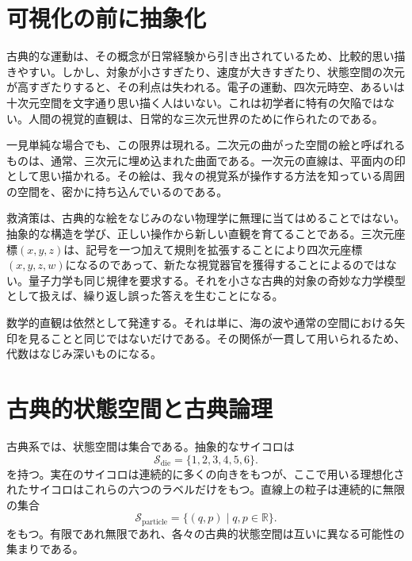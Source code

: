 \section{可視化の前に抽象化}

古典的な運動は、その概念が日常経験から引き出されているため、比較的思い描きやすい。しかし、対象が小さすぎたり、速度が大きすぎたり、状態空間の次元が高すぎたりすると、その利点は失われる。電子の運動、四次元時空、あるいは十次元空間を文字通り思い描く人はいない。これは初学者に特有の欠陥ではない。人間の視覚的直観は、日常的な三次元世界のために作られたのである。

一見単純な場合でも、この限界は現れる。二次元の曲がった空間の絵と呼ばれるものは、通常、三次元に埋め込まれた曲面である。一次元の直線は、平面内の印として思い描かれる。その絵は、我々の視覚系が操作する方法を知っている周囲の空間を、密かに持ち込んでいるのである。

救済策は、古典的な絵をなじみのない物理学に無理に当てはめることではない。抽象的な構造を学び、正しい操作から新しい直観を育てることである。三次元座標\((x,y,z)\)は、記号を一つ加えて規則を拡張することにより四次元座標\((x,y,z,w)\)になるのであって、新たな視覚器官を獲得することによるのではない。量子力学も同じ規律を要求する。それを小さな古典的対象の奇妙な力学模型として扱えば、繰り返し誤った答えを生むことになる。

\begin{remark}
数学的直観は依然として発達する。それは単に、海の波や通常の空間における矢印を見ることと同じではないだけである。その関係が一貫して用いられるため、代数はなじみ深いものになる。
\end{remark}

\section{古典的状態空間と古典論理}

古典系では、状態空間は集合である。抽象的なサイコロは
\begin{equation}
  \mathcal S_{\mathrm{die}}=\{1,2,3,4,5,6\}.
\end{equation}
を持つ。実在のサイコロは連続的に多くの向きをもつが、ここで用いる理想化されたサイコロはこれらの六つのラベルだけをもつ。直線上の粒子は連続的に無限の集合
\begin{equation}
  \mathcal S_{\mathrm{particle}}
  =
  \{(q,p)\mid q,p\in\mathbb R\}.
\end{equation}
をもつ。有限であれ無限であれ、各々の古典的状態空間は互いに異なる可能性の集まりである。

